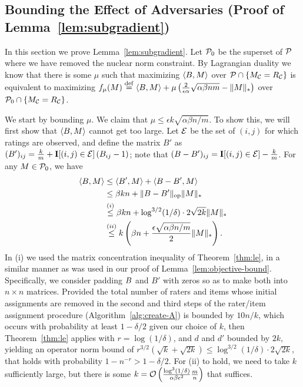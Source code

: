 \subsection{Bounding the Effect of Adversaries (Proof of Lemma~\ref{lem:subgradient})}
\label{sec:subgradient-proof}
In this section we prove Lemma~\ref{lem:subgradient}.
Let $\mathcal{P}_0$ be the superset of $\mathcal{P}$ where we have removed the 
nuclear norm constraint. By Lagrangian duality we 
know that there is some $\mu$ such that maximizing 
$\langle B, M \rangle$ over $\mathcal{P} \cap \{M_{\mathcal{C}} = R_{\mathcal{C}}\}$ 
is equivalent to maximizing $f_\mu(M) \stackrel{\rm def}{=} \langle B, M \rangle + \mu\left( \frac{2}{\epsilon\alpha}\sqrt{\alpha\beta nm} - \|M\|_* \right)$ over 
$\mathcal{P}_0 \cap \{M_{\mathcal{C}} = R_{\mathcal{C}}\}$. 

We start by bounding $\mu$. We claim that 
$\mu \leq \epsilon k \sqrt{\alpha\beta n/m}$. 
To show this, we will first show that $\langle B, M \rangle$ cannot get 
too large. Let $\mathcal{E}$ be the set of $(i,j)$ for which ratings are observed, 
and define the matrix $B'$ as 
$(B')_{ij} = \frac{k}{m} + \mathbf{I}[(i,j) \in \mathcal{E}]\left( B_{ij} - 1 \right)$; note 
that $(B-B')_{ij} = \mathbf{I}[(i,j) \in \mathcal{E}] - \frac{k}{m}$.
For any $M \in \mathcal{P}_0$, we have 
\begin{align}
\langle B, M \rangle &\leq \langle B', M \rangle + \langle B - B', M \rangle \\
 &\leq \beta kn + \|B - B'\|_{\mathrm{op}}\|M\|_* \\
 &\stackrel{(i)}{\leq} \beta kn + \log^{3/2}(1/\delta) \cdot 2\sqrt{2k}\|M\|_* \\
 &\stackrel{(ii)}{\leq} k\left( \beta n +  \frac{\epsilon\sqrt{\alpha\beta n/m}}{2} \|M\|_* \right).
\end{align}
In (i) we used the matrix concentration inequality of Theorem~\ref{thm:le}, in a similar manner as was used in our proof of Lemma~\ref{lem:objective-bound}.  Specifically, we consider padding $B$ and $B'$ with zeros so as to make both into $n\times n$ matrices. Provided the total number of raters and items whose initial assignments are removed in the second and third steps of the rater/item assignment procedure (Algorithm~\ref{alg:create-A}) is bounded by $10n/k$, which occurs with probability at least $1-\delta/2$ given our choice of $k$, then Theorem~\ref{thm:le} applies with $r = \log (1/\delta)$, and $d$ and $d'$ bounded by $2k$, yielding an operator norm bound of $r^{3/2}(\sqrt{k} +\sqrt{2k}) \le \log^{3/2}(1/\delta) \cdot 2\sqrt{2k}$, that holds with probability $1-n^{-r} > 1-\delta/2$.  For (ii) to hold, we need to take $k$ sufficiently large, but 
there is some $k = \mathcal{O}\left( \frac{\log^3(1/\delta)}{\alpha\beta\epsilon^2}\frac{m}{n} \right)$ 
that suffices.

